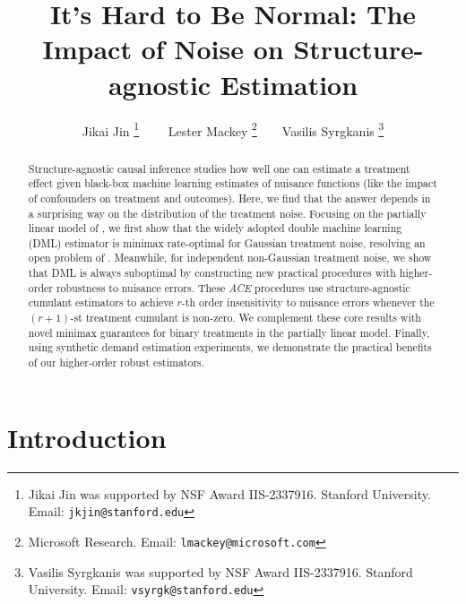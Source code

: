 \documentclass{article}
\title{It's Hard to Be Normal: The Impact of Noise on Structure-agnostic Estimation}
\author{Jikai Jin \thanks{Jikai Jin was supported by NSF Award IIS-2337916. Stanford University. Email: \texttt{jkjin@stanford.edu}}
~~~~Lester Mackey \thanks{Microsoft Research. Email: \texttt{lmackey@microsoft.com}}~~~~Vasilis Syrgkanis \thanks{Vasilis Syrgkanis was supported by NSF Award IIS-2337916. Stanford University. Email: \texttt{vsyrgk@stanford.edu}}}}
\begin{document}
\doparttoc %
\faketableofcontents %

%

%
%

%

\maketitle

\begin{abstract}
%
Structure-agnostic causal inference studies how well one can estimate a treatment effect given black-box machine learning estimates of nuisance functions (like the impact of confounders on treatment and outcomes). 
Here, we find that the answer depends in a surprising way on the distribution of the treatment noise. Focusing on the partially linear model of \citet{robinson1988root}, we first show that the widely adopted double machine learning (DML) estimator is minimax rate-optimal for Gaussian treatment noise, resolving an open problem of \citet{mackey2018orthogonal}. Meanwhile, for independent non-Gaussian treatment noise, we show that DML is always suboptimal by constructing new practical procedures with higher-order robustness to nuisance errors. These \emph{ACE} procedures use  structure-agnostic cumulant estimators to achieve $r$-th order insensitivity to nuisance errors whenever the $(r+1)$-st treatment cumulant is non-zero. We complement these core results with novel minimax guarantees for binary treatments in the partially linear model. Finally, using synthetic demand estimation experiments, we demonstrate the practical benefits of our higher-order robust estimators.
\end{abstract}




\section{Introduction}
\label{sec:intro}
\end{document}

